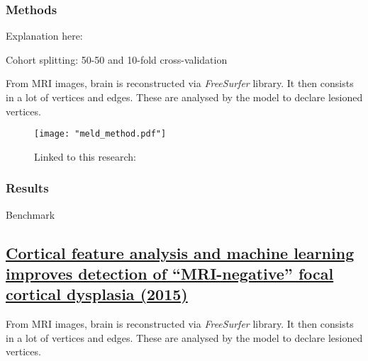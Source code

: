 \subsubsection{Methods}

Explanation here: 

Cohort splitting: 50-50 and 10-fold cross-validation

From MRI images, brain is reconstructed via \emph{FreeSurfer} library. It then consists in a lot of vertices and edges.
These are analysed by the model to declare lesioned vertices.

\begin{figure}[htbp]
	\centering
	\texttt{[image: "meld\_method.pdf"]}
	\caption{Linked to this research: }%
	\label{fig:meld_explanation}
\end{figure}

\subsubsection{Results}

\begin{table}[htbp]
	\centering
	\caption{Benchmark}

	\caption{Results}
\end{table}

\subsection{\href{https://www.sciencedirect.com/science/article/pii/S1525505015002322}{Cortical feature analysis and machine learning improves detection of “MRI-negative” focal cortical dysplasia (2015)}}
\label{sub:sec:res3}

From MRI images, brain is reconstructed via \emph{FreeSurfer} library. It then consists in a lot of vertices and edges.
These are analysed by the model to declare lesioned vertices.

